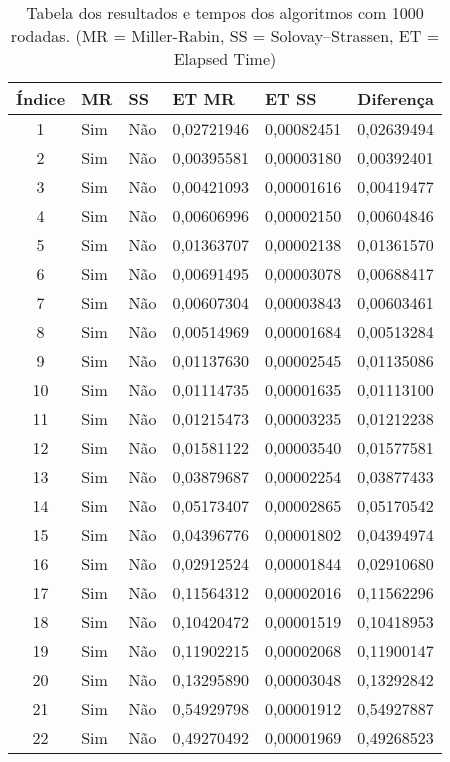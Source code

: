 \documentclass[openany]{ufsctex/ufsctex}
\begin{document}
\begin{longtable}{|c|p{1cm}|p{1cm}|p{2cm}|p{2cm}|p{2cm}|}
 \caption{Tabela dos resultados e tempos dos algoritmos com 1000 rodadas. (MR = Miller-Rabin, SS = Solovay–Strassen, ET = Elapsed Time) }\label{tab:comparacao}\\
 \hline
 Índice & MR & SS & ET MR & ET SS & Diferença \\ \hline
 1 & Sim & Não & 0,02721946 & 0,00082451 & 0,02639494\\ \hline 
2 & Sim & Não & 0,00395581 & 0,00003180 & 0,00392401\\ \hline 
3 & Sim & Não & 0,00421093 & 0,00001616 & 0,00419477\\ \hline 
4 & Sim & Não & 0,00606996 & 0,00002150 & 0,00604846\\ \hline 
5 & Sim & Não & 0,01363707 & 0,00002138 & 0,01361570\\ \hline 
6 & Sim & Não & 0,00691495 & 0,00003078 & 0,00688417\\ \hline 
7 & Sim & Não & 0,00607304 & 0,00003843 & 0,00603461\\ \hline 
8 & Sim & Não & 0,00514969 & 0,00001684 & 0,00513284\\ \hline 
9 & Sim & Não & 0,01137630 & 0,00002545 & 0,01135086\\ \hline 
10 & Sim & Não & 0,01114735 & 0,00001635 & 0,01113100\\ \hline 
11 & Sim & Não & 0,01215473 & 0,00003235 & 0,01212238\\ \hline 
12 & Sim & Não & 0,01581122 & 0,00003540 & 0,01577581\\ \hline 
13 & Sim & Não & 0,03879687 & 0,00002254 & 0,03877433\\ \hline 
14 & Sim & Não & 0,05173407 & 0,00002865 & 0,05170542\\ \hline 
15 & Sim & Não & 0,04396776 & 0,00001802 & 0,04394974\\ \hline 
16 & Sim & Não & 0,02912524 & 0,00001844 & 0,02910680\\ \hline 
17 & Sim & Não & 0,11564312 & 0,00002016 & 0,11562296\\ \hline 
18 & Sim & Não & 0,10420472 & 0,00001519 & 0,10418953\\ \hline 
19 & Sim & Não & 0,11902215 & 0,00002068 & 0,11900147\\ \hline 
20 & Sim & Não & 0,13295890 & 0,00003048 & 0,13292842\\ \hline 
21 & Sim & Não & 0,54929798 & 0,00001912 & 0,54927887\\ \hline 
22 & Sim & Não & 0,49270492 & 0,00001969 & 0,49268523\\ \hline 

\end{longtable}
\end{document}
